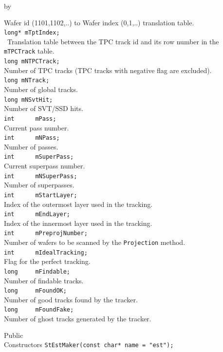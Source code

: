 \documentclass[twoside]{article}
\newcommand{\entrylabel}[1]{\mbox{\textbf{{#1}}}\hfil}%
\newenvironment{entry}
{\begin{list}{}%
    {\renewcommand{\makelabel}{\entrylabel}%
     \setlength{\labelwidth}{90pt}%
     \setlength{\leftmargin}{\labelwidth}
     \advance\leftmargin by \labelsep%
      }%
    }%
  {\end{list}}
\newcommand{\Entrylabel}[1]%
{\raisebox{0pt}[1ex][0pt]{\makebox[\labelwidth][l]%
    {\parbox[t]{\labelwidth}{\hspace{0pt}\textbf{{#1}}}}}}
\newenvironment{Entry}%
{\renewcommand{\entrylabel}{\Entrylabel}\begin{entry}}%
  {\end{entry}}
\begin{document}
\begin{Entry}
	Wafer id (1101,1102,..) to Wafer index (0,1,..) translation table.\\
	\verb+long* mTptIndex;+\\\
	Translation table between the TPC track id and its row number in the \verb+mTPCTrack+ table.\\
	\verb+long mNTPCTrack;+\\
	Number of TPC tracks (TPC tracks with negative flag are excluded).\\
	\verb+long mNTrack;+\\
	Number of global tracks.\\
	\verb+long mNSvtHit;+\\
	Number of SVT/SSD hits.\\
	\verb+int      mPass;+\\
	Current pass number.\\
	\verb+int      mNPass;+\\
	Number of passes.\\
	\verb+int      mSuperPass;+\\
	Current superpass number.\\
	\verb+int      mNSuperPass;+\\
	Number of superpasses.\\
	\verb+int      mStartLayer;+\\
	Index of the outermost layer used in the tracking.\\
	\verb+int      mEndLayer;+\\
	Index of the innermost layer used in the tracking.\\
	\verb+int      mPreprojNumber;+\\
	Number of wafers to be scanned by the \verb+Projection+ method.\\
	\verb+int      mIdealTracking;+\\
	Flag for the perfect tracking.\\
	\verb+long     mFindable;+\\
	Number of findable tracks.\\
	\verb+long     mFoundOK;+\\
	Number of good tracks found by the tracker.\\
	\verb+long     mFoundFake;+\\
	Number of ghost tracks generated by the tracker.\\
\item[Public\\ Constructors]
	\verb+StEstMaker(const char* name = "est");+\\

\end{Entry}
\end{document}
